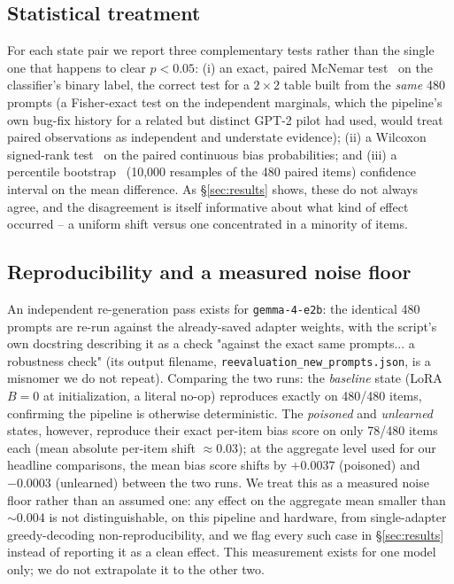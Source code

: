 \documentclass[runningheads]{llncs}
\begin{document}
\subsection{Statistical treatment}
\label{sec:stats}
For each state pair we report three complementary tests rather than the single one that happens to clear $p<0.05$: (i) an exact, paired McNemar test~\cite{mcnemar1947note} on the classifier's binary label, the correct test for a $2\times2$ table built from the \emph{same} 480 prompts (a Fisher-exact test on the independent marginals, which the pipeline's own bug-fix history for a related but distinct GPT-2 pilot had used, would treat paired observations as independent and understate evidence); (ii) a Wilcoxon signed-rank test~\cite{wilcoxon1945individual} on the paired continuous bias probabilities; and (iii) a percentile bootstrap~\cite{efron1979bootstrap} (10{,}000 resamples of the 480 paired items) confidence interval on the mean difference. As \S\ref{sec:results} shows, these do not always agree, and the disagreement is itself informative about what kind of effect occurred -- a uniform shift versus one concentrated in a minority of items.

\subsection{Reproducibility and a measured noise floor}
\label{sec:noisefloor}
An independent re-generation pass exists for \texttt{gemma-4-e2b}: the identical 480 prompts are re-run against the already-saved adapter weights, with the script's own docstring describing it as a check "against the exact same prompts... a robustness check" (its output filename, \texttt{reevaluation\_\allowbreak new\_\allowbreak prompts.json}, is a misnomer we do not repeat). Comparing the two runs: the \emph{baseline} state (LoRA $B{=}0$ at initialization, a literal no-op) reproduces exactly on 480/480 items, confirming the pipeline is otherwise deterministic. The \emph{poisoned} and \emph{unlearned} states, however, reproduce their exact per-item bias score on only 78/480 items each (mean absolute per-item shift $\approx 0.03$); at the aggregate level used for our headline comparisons, the mean bias score shifts by $+0.0037$ (poisoned) and $-0.0003$ (unlearned) between the two runs. We treat this as a measured noise floor rather than an assumed one: any effect on the aggregate mean smaller than $\sim\!0.004$ is not distinguishable, on this pipeline and hardware, from single-adapter greedy-decoding non-reproducibility, and we flag every such case in \S\ref{sec:results} instead of reporting it as a clean effect. This measurement exists for one model only; we do not extrapolate it to the other two.
\end{document}
